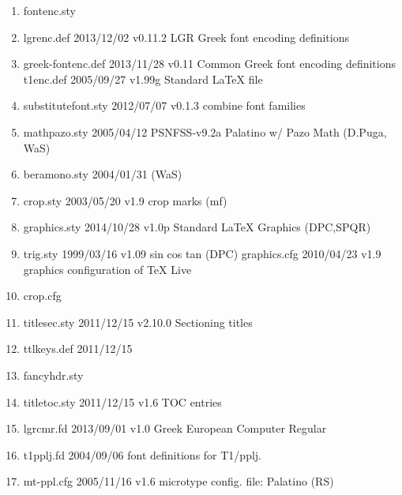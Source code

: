 \begin{enumerate}
\item fontenc.sty
\item lgrenc.def 2013/12/02 v0.11.2 LGR Greek font encoding definitions
\item greek-fontenc.def 2013/11/28 v0.11 Common Greek font encoding definitions
t1enc.def 2005/09/27 v1.99g Standard LaTeX file
\item substitutefont.sty 2012/07/07 v0.1.3 combine font families
\item mathpazo.sty 2005/04/12 PSNFSS-v9.2a Palatino w/ Pazo Math (D.Puga, WaS) 
\item beramono.sty 2004/01/31 (WaS)
\item crop.sty 2003/05/20 v1.9 crop marks (mf)
\item graphics.sty 2014/10/28 v1.0p Standard LaTeX Graphics (DPC,SPQR)
\item trig.sty 1999/03/16 v1.09 sin cos tan (DPC)
graphics.cfg 2010/04/23 v1.9 graphics configuration of TeX Live
\item crop.cfg
\item titlesec.sty 2011/12/15 v2.10.0 Sectioning titles
\item ttlkeys.def 2011/12/15
\item fancyhdr.sty 
\item titletoc.sty 2011/12/15 v1.6 TOC entries
\item lgrcmr.fd 2013/09/01 v1.0 Greek European Computer Regular
\item t1pplj.fd 2004/09/06 font definitions for T1/pplj.
\item mt-ppl.cfg 2005/11/16 v1.6 microtype config. file: Palatino (RS)


\end{enumerate}
